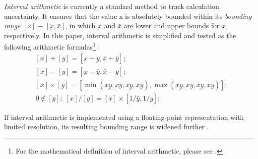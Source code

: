 \documentclass[twoside]{article}
\numberwithin{equation}{section}
\begin{document}
\emph{Interval arithmetic} \cite{Precise_Numerical_Methods}\cite{Interval_Analysis}\cite{Worst_Case_Error_Bounds}\cite{Interval_Analysis_Theory_Applications}\cite{Interval_Arithmetic}\cite{Interval_Analysis_Notations} is currently a standard method to track calculation uncertainty.  
It ensures that the value x is absolutely bounded within its \emph{bounding range} $[x] \equiv [\underbar{x}, \bar{x}]$, in which $\underbar{x}$ and $\bar{x}$ are lower and upper bounds for $x$, respectively. 
In this paper, interval arithmetic is simplified and tested as the following arithmetic formulas\footnote{For the mathematical definition of interval arithmetic, please see \cite{Interval_Analysis_Notations}.} \cite{Interval_Analysis_Theory_Applications}:
\begin{align}
\label{eqn: interval +} & 
\left[x\right] + \left[y\right] = \left[\underbar{x} + \underbar{y}, \bar{x} + \bar{y}\right]; \\
\label{eqn: interval -} & 
\left[x\right] - \left[y\right] = \left[\underbar{x} - \bar{y}, \bar{x} - \underbar{y}\right]; \\
\label{eqn: interval *} &
\left[x\right] \times \left[y\right] = \left[\min(\underbar{x}  \underbar{y}, \underbar{x}  \bar{y}, \bar{x}  \underbar{y}, \bar{x}  \bar{y}), \max(\underbar{x}  \underbar{y}, \underbar{x}  \bar{y}, \bar{x}  \underbar{y}, \bar{x}  \bar{y})\right]; \\
\label{eqn: interval /} & 0 \notin \left[y\right]: \;
\left[x\right] / \left[y\right] = \left[x\right] \times \left[1/\bar{y}, 1/\underbar{y}\right];
\end{align}

If interval arithmetic is implemented using a floating-point representation with limited resolution, its resulting bounding range is widened further \cite{Worst_Case_Error_Bounds}.
\end{document}
